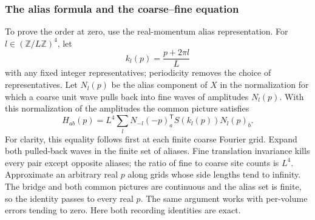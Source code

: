 \subsubsection{The alias formula and the coarse--fine equation}
To prove the order at zero, use the real-momentum alias
representation. For $l\in(\mathbb Z/L\mathbb Z)^4$, let
\[
                    k_l(p)=\frac{p+2\pi l}{L}
\]
with any fixed integer representatives; periodicity removes the
choice of representatives. Let $N_l(p)$ be the alias component
of $X$ in the normalization for which a coarse unit wave pulls
back into fine waves of amplitudes $N_l(p)$. With this
normalization of the amplitudes the common picture satisfies
\begin{equation}\label{eq:inherited-alias}
 H_{ab}(p)=L^4\sum_l
     N_{-l}(-p)_a^{\mathsf T}S(k_l(p))N_l(p)_b.
\end{equation}
For clarity, this equality follows first at each finite coarse
Fourier grid. Expand both pulled-back waves in the finite set
of aliases. Fine translation invariance kills every pair except
opposite aliases; the ratio of fine to coarse site counts is
$L^4$. Approximate an arbitrary real $p$ along grids whose side
lengths tend to infinity. The bridge and both common pictures
are continuous and the alias set is finite, so the identity
passes to every real $p$. The same argument works with
per-volume errors tending to zero. Here both recording identities
are exact.

